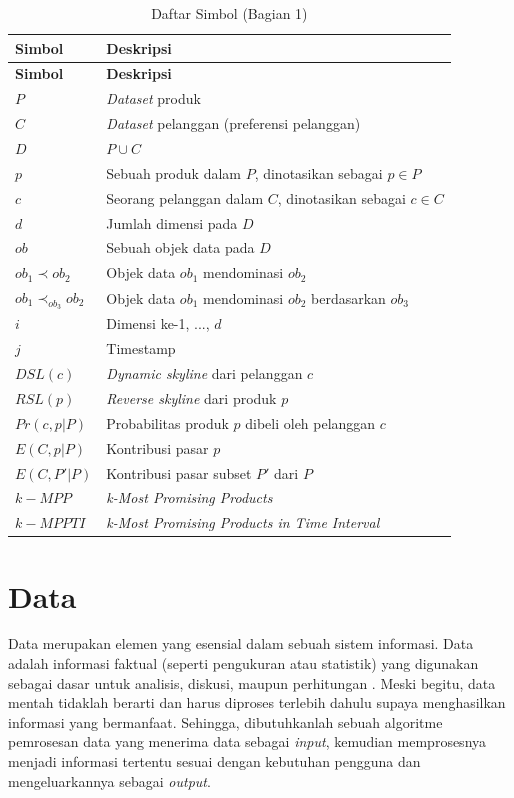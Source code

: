 \begin{longtable}{| p{3cm} | p{7cm} |} 
	\caption{Daftar Simbol (Bagian 1) \label{tabel:daftar-simbol-bag1}}\\
	\hline
	\multicolumn{1}{|p{3cm}|}{\textbf{Simbol}} & \multicolumn{1}{|p{7cm}|}{\textbf{Deskripsi}}\\ \hline
	\hline
	\endfirsthead
	\hline
	\multicolumn{1}{|p{3cm}|}{\textbf{Simbol}} & \multicolumn{1}{|p{7cm}|}{\textbf{Deskripsi}}\\ \hline 
	\endhead
	$P$ & \textit{Dataset} produk\\ \hline
	$C$ & \textit{Dataset} pelanggan (preferensi pelanggan)\\ \hline
	$D$ & $P \cup C$ \\ \hline
	$p$ & Sebuah produk dalam $P$, dinotasikan sebagai $p \in P$\\ \hline
	$c$ & Seorang pelanggan dalam $C$, dinotasikan sebagai $c \in C$\\ \hline
	$d$ & Jumlah dimensi pada $D$\\ \hline
	$ob$ & Sebuah objek data pada $D$\\ \hline
	$ob_1 \prec ob_2$ & Objek data $ob_1$ mendominasi $ob_2$\\ \hline
	$ob_1 \prec_{ob_3} ob_2$ & Objek data $ob_1$ mendominasi $ob_2$ berdasarkan $ob_3$\\ \hline
	$i$ & Dimensi ke-1, ..., $d$\\ \hline
	$j$ & Timestamp\\ \hline
	$DSL(c)$ & \textit{Dynamic skyline} dari pelanggan $c$\\ \hline
	$RSL(p)$ & \textit{Reverse skyline} dari produk $p$\\ \hline
	$Pr(c, p|P)$ & Probabilitas produk $p$ dibeli oleh pelanggan $c$ \\ \hline
	$E(C, p|P)$ & Kontribusi pasar $p$\\ \hline
	$E(C, P'|P)$ & Kontribusi pasar subset $P'$ dari $P$ \\ \hline
	$k-MPP$ & \textit{k-Most Promising Products} \\ \hline
	$k-MPPTI$ & \textit{k-Most Promising Products in Time Interval} \\ \hline
\end{longtable}

\section{Data}
\tab Data merupakan elemen yang esensial dalam sebuah sistem informasi. Data adalah informasi faktual (seperti pengukuran atau statistik) yang digunakan sebagai dasar untuk analisis, diskusi, maupun perhitungan \cite{data}. Meski begitu, data mentah tidaklah berarti dan harus diproses terlebih dahulu supaya menghasilkan informasi yang bermanfaat. Sehingga, dibutuhkanlah sebuah algoritme pemrosesan data yang menerima data sebagai \textit{input}, kemudian memprosesnya menjadi informasi tertentu sesuai dengan kebutuhan pengguna dan mengeluarkannya sebagai \textit{output}.

